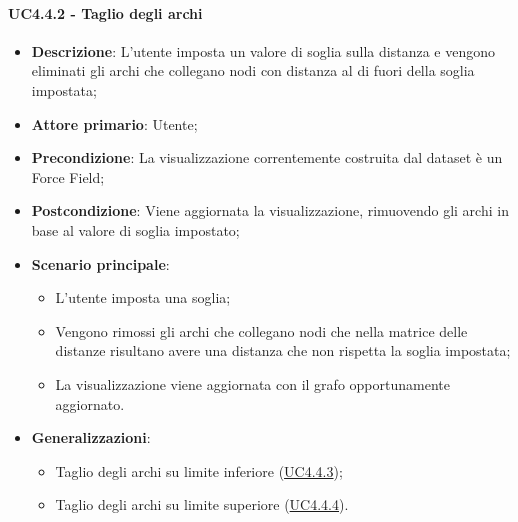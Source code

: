 \paragraph{UC4.4.2 - Taglio degli archi}
\label{par:uc4.4.2}
\begin{itemize}
    \item \textbf{Descrizione}:     L'utente imposta un valore di soglia sulla distanza e vengono eliminati gli archi che collegano nodi con distanza al di fuori della soglia impostata;
    \item \textbf{Attore primario}: Utente;
    \item \textbf{Precondizione}:   La visualizzazione correntemente costruita dal dataset è un Force Field;
    \item \textbf{Postcondizione}:  Viene aggiornata la visualizzazione, rimuovendo gli archi in base al valore di soglia impostato;
    \item \textbf{Scenario principale}:
    \begin{itemize}
        \item L'utente imposta una soglia;
        \item Vengono rimossi gli archi che collegano nodi che nella matrice delle distanze risultano avere una distanza che non rispetta la soglia impostata;
        \item La visualizzazione viene aggiornata con il grafo opportunamente aggiornato.
    \end{itemize}

    \item \textbf{Generalizzazioni}:
    \begin{itemize}
        \item Taglio degli archi su limite inferiore (\hyperref[par:uc4.4.3]{UC4.4.3});
        \item Taglio degli archi su limite superiore (\hyperref[par:uc4.4.4]{UC4.4.4}).
    \end{itemize}
\end{itemize}

